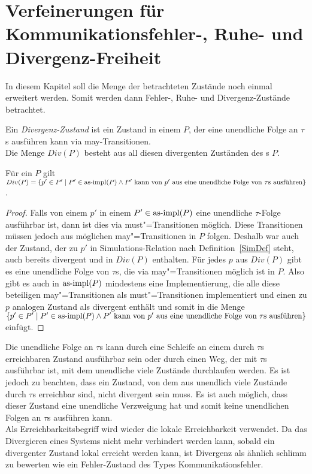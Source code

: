 \chapter{Verfeinerungen für Kommunikationsfehler-, Ruhe- und Divergenz-Freiheit}

In diesem Kapitel soll die Menge der betrachteten Zustände noch einmal
erweitert werden. Somit werden dann Fehler-, Ruhe- und Divergenz-Zustände
betrachtet.

\begin{Def}[Divergenz]
  Ein \emph{Divergenz-Zustand} ist ein Zustand in einem \MEIO{} $P$, der eine
  unendliche Folge an $\tau$s ausführen kann via may-Transitionen.\\
  Die Menge $Div(P)$ besteht aus all diesen divergenten Zuständen des \MEIO{}s
  $P$.
\end{Def}

\begin{Prop}
  \label{DivProp}
  Für ein \MEIO{} $P$ gilt $Div (P) = \left\{p'\in P'\mid P'\in\mathrm{as}\text{-}\mathrm{impl} (P)
  \land P' \text{ kann von } p' \text{ aus eine unendliche Folge von } \tau
  \text{s ausführen} \right\}$.
\end{Prop}
\begin{proof}
  Falls von einem $p'$ in einem $P'\in\mathrm{as}\text{-}\mathrm{impl} (P)$ eine unendliche $\tau$-Folge
  ausführbar ist, dann ist dies via must"=Transitionen möglich. Diese
  Transitionen müssen jedoch aus möglichen may"=Transitionen in $P$ folgen.
  Deshalb war auch der Zustand, der zu $p'$ in Simulations-Relation nach
  Definition~\ref{SimDef} steht, auch bereits divergent und in $Div (P)$
  enthalten. Für jedes $p$ aus $Div (P)$ gibt es eine unendliche Folge von
  $\tau$s, die via may"=Transitionen möglich ist in $P$. Also gibt es auch in
  $\mathrm{as}\text{-}\mathrm{impl} (P)$ mindestens eine Implementierung, die alle diese beteiligen
  may"=Transitionen als must"=Transitionen implementiert und einen zu $p$
  analogen Zustand als divergent enthält und somit in die Menge $\left\{p'\in
  P'\mid P'\in\mathrm{as}\text{-}\mathrm{impl} (P) \land P' \text{ kann von } p' \text{ aus eine
  unendliche Folge von } \tau \text{s ausführen} \right\}$ einfügt.
\end{proof}

Die unendliche Folge an $\tau$s kann durch eine Schleife an einem durch $\tau$s
erreichbaren Zustand ausführbar sein oder durch einen Weg, der mit $\tau$s
ausführbar ist, mit dem unendliche viele Zustände durchlaufen werden. Es ist
jedoch zu beachten, dass ein Zustand, von dem aus unendlich viele Zustände
durch $\tau$s  erreichbar sind, nicht divergent sein muss. Es ist auch möglich,
dass dieser Zustand eine unendliche Verzweigung hat und somit keine unendlichen
Folgen an $\tau$s ausführen kann.\\
Als Erreichbarkeitsbegriff wird wieder die lokale Erreichbarkeit verwendet. Da
das Divergieren eines Systems nicht mehr verhindert werden kann, sobald ein
divergenter Zustand lokal erreicht werden kann, ist Divergenz als ähnlich \glqq
schlimm\grqq{} zu bewerten wie ein Fehler-Zustand des Types
Kommunikationsfehler.

